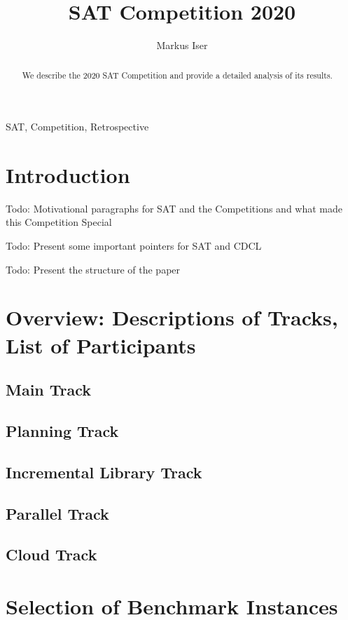 \documentclass{elsarticle}
\title{SAT Competition 2020\tnoteref{title}}
\author[kit]{Markus Iser}
\newcommand{\todo}[1]{{\color{purple}Todo: #1}}
\begin{document}
\begin{abstract}
We describe the 2020 SAT Competition and provide a detailed analysis of its results.
\end{abstract}

\begin{keyword}
SAT, Competition, Retrospective
\end{keyword}

\maketitle

\section{Introduction}

\todo{Motivational paragraphs for SAT and the Competitions and what made this Competition Special}

\todo{Present some important pointers for SAT and CDCL}

\todo{Present the structure of the paper}


\section{Overview: Descriptions of Tracks, List of Participants}

\subsection{Main Track}

\subsection{Planning Track}

\subsection{Incremental Library Track}

\subsection{Parallel Track}

\subsection{Cloud Track}


\section{Selection of Benchmark Instances}
\end{document}
